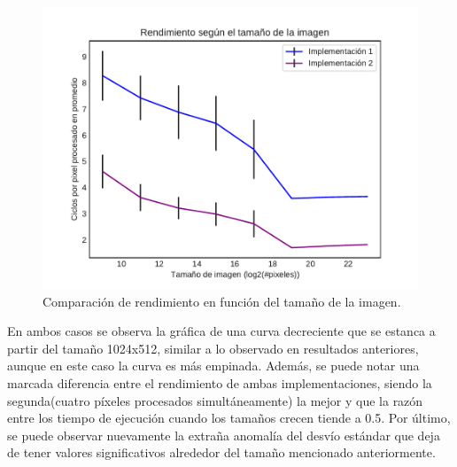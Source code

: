 \documentclass[a4paper]{article}
\begin{document}
\begin{figure}[h]
	\centering
	\includegraphics[scale=0.55]{img/ReforzarBrillo2vs4.pdf}
	\caption{Comparación de rendimiento en función del tamaño de la imagen.}
\end{figure}	
\justify
En ambos casos se observa la gráfica de una curva decreciente que se estanca a partir del tamaño 1024x512, similar a lo observado en resultados anteriores, aunque en este caso la curva es más empinada. Además, se puede notar una marcada diferencia entre el rendimiento de ambas implementaciones, siendo la segunda(cuatro píxeles procesados simultáneamente) la mejor y que la razón entre los tiempo de ejecución cuando los tamaños crecen tiende a 0.5. Por último, se puede observar nuevamente la extraña anomalía del desvío estándar que deja de tener valores significativos alrededor del tamaño mencionado anteriormente.
\end{document}
